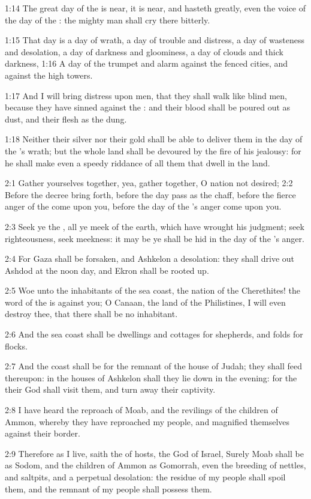 1:14 The great day of the \LORD is near, it is near, and hasteth greatly, even the voice of the day of the \LORD: the mighty man shall cry there bitterly.

1:15 That day is a day of wrath, a day of trouble and distress, a day of wasteness and desolation, a day of darkness and gloominess, a day of clouds and thick darkness, 1:16 A day of the trumpet and alarm against the fenced cities, and against the high towers.

1:17 And I will bring distress upon men, that they shall walk like blind men, because they have sinned against the \LORD: and their blood shall be poured out as dust, and their flesh as the dung.

1:18 Neither their silver nor their gold shall be able to deliver them in the day of the \LORD's wrath; but the whole land shall be devoured by the fire of his jealousy: for he shall make even a speedy riddance of all them that dwell in the land.

2:1 Gather yourselves together, yea, gather together, O nation not desired; 2:2 Before the decree bring forth, before the day pass as the chaff, before the fierce anger of the \LORD come upon you, before the day of the \LORD's anger come upon you.

2:3 Seek ye the \LORD, all ye meek of the earth, which have wrought his judgment; seek righteousness, seek meekness: it may be ye shall be hid in the day of the \LORD's anger.

2:4 For Gaza shall be forsaken, and Ashkelon a desolation: they shall drive out Ashdod at the noon day, and Ekron shall be rooted up.

2:5 Woe unto the inhabitants of the sea coast, the nation of the Cherethites! the word of the \LORD is against you; O Canaan, the land of the Philistines, I will even destroy thee, that there shall be no inhabitant.

2:6 And the sea coast shall be dwellings and cottages for shepherds, and folds for flocks.

2:7 And the coast shall be for the remnant of the house of Judah; they shall feed thereupon: in the houses of Ashkelon shall they lie down in the evening: for the \LORD their God shall visit them, and turn away their captivity.

2:8 I have heard the reproach of Moab, and the revilings of the children of Ammon, whereby they have reproached my people, and magnified themselves against their border.

2:9 Therefore as I live, saith the \LORD of hosts, the God of Israel, Surely Moab shall be as Sodom, and the children of Ammon as Gomorrah, even the breeding of nettles, and saltpits, and a perpetual desolation: the residue of my people shall spoil them, and the remnant of my people shall possess them.

